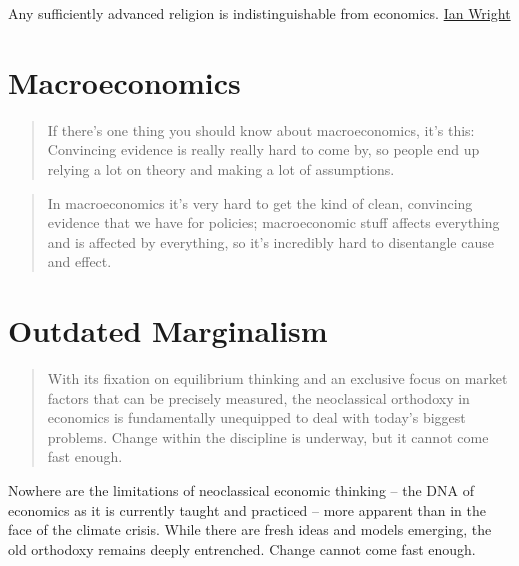 \documentclass[
]{book}
\begin{document}
Any sufficiently advanced religion is indistinguishable from economics.
\href{https://ianwrightsite.wordpress.com/2021/11/25/dark-eucharist-of-the-real-god/}{Ian Wright}

\hypertarget{macroeconomics}{%
\section{Macroeconomics}\label{macroeconomics}}

\begin{quote}
If there's one thing you should know about macroeconomics, it's this:
Convincing evidence is really really hard to come by,
so people end up relying a lot on theory and
making a lot of assumptions.
\end{quote}

\begin{quote}
In macroeconomics it's very hard to get the kind of clean,
convincing evidence that we have for policies;
macroeconomic stuff affects everything and is affected by everything,
so it's incredibly hard to disentangle cause and effect.
\end{quote}

\hypertarget{outdated-marginalism}{%
\section{Outdated Marginalism}\label{outdated-marginalism}}

\begin{quote}
With its fixation on equilibrium thinking and an exclusive focus on market factors that can be precisely measured, the neoclassical orthodoxy in economics is fundamentally unequipped to deal with today's biggest problems. Change within the discipline is underway, but it cannot come fast enough.
\end{quote}

Nowhere are the limitations of neoclassical economic thinking -- the DNA of economics as it is currently taught and practiced -- more apparent than in the face of the climate crisis. While there are fresh ideas and models emerging, the old orthodoxy remains deeply entrenched. Change cannot come fast enough.
\end{document}
